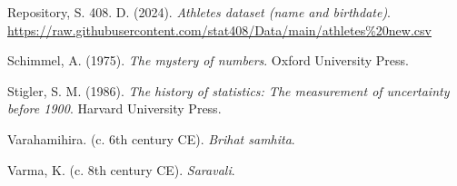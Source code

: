 \documentclass[
  american,
  11pt,
  oneside,
  openany]{article}
\newlength{\cslhangindent}
\newenvironment{CSLReferences}[2] %
 {\begin{list}{}{%
  \setlength{\itemindent}{0pt}
  \setlength{\leftmargin}{0pt}
  \setlength{\parsep}{0pt}
  \ifodd #1
   \setlength{\leftmargin}{\cslhangindent}
   \setlength{\itemindent}{-1\cslhangindent}
  \fi
  \setlength{\itemsep}{#2\baselineskip}}}
 {\end{list}}
\begin{document}
\begin{CSLReferences}{1}{0}
Repository, S. 408. D. (2024). \emph{Athletes dataset (name and
birthdate)}.
\url{https://raw.githubusercontent.com/stat408/Data/main/athletes\%20new.csv}

Schimmel, A. (1975). \emph{The mystery of numbers}. Oxford University
Press.

Stigler, S. M. (1986). \emph{The history of statistics: The measurement
of uncertainty before 1900}. Harvard University Press.

Varahamihira. (c. 6th century CE). \emph{Brihat samhita}.

Varma, K. (c. 8th century CE). \emph{Saravali}.

\end{CSLReferences}
\end{document}
